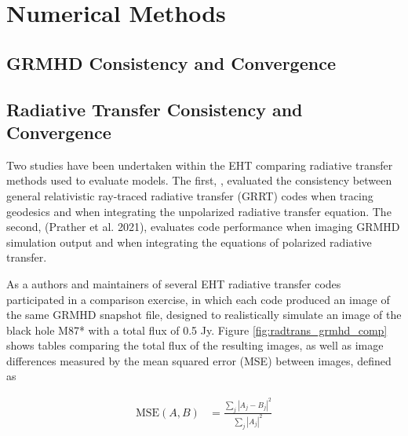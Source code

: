 \section{Numerical Methods}\label{app:numerical}

\subsection{GRMHD Consistency and Convergence}\label{app:resolution_study}





\subsection{Radiative Transfer Consistency and Convergence}
\label{app:radtrans}


Two studies have been undertaken within the EHT comparing radiative transfer methods used to evaluate models.  The first, \cite{2020ApJ...897..148G}, evaluated the consistency between general relativistic ray-traced radiative transfer (GRRT) codes when tracing geodesics and when integrating the unpolarized radiative transfer equation.  The second, (Prather et al. 2021), evaluates code performance when imaging GRMHD simulation output and when integrating the equations of polarized radiative transfer.

As a  authors and maintainers of several EHT radiative transfer codes participated in a comparison exercise, in which each code produced an image of the same GRMHD snapshot file, designed to realistically simulate an image of the black hole M87* with a total flux of 0.5 Jy.  Figure \ref{fig:radtrans_grmhd_comp} shows tables comparing the total flux of the resulting images, as well as image differences measured by the mean squared error (MSE) between images, defined as

\begin{align}
    \mathrm{MSE}(A, B) &= \frac{\sum_j|A_j-B_j|^2}{\sum_j|A_j|^2}
\end{align}


